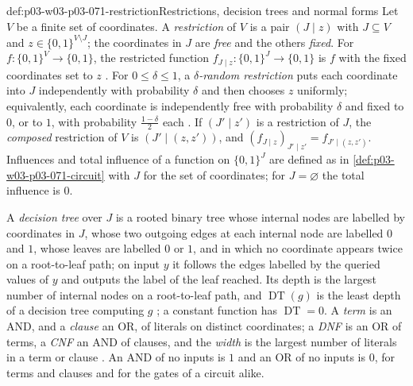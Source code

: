 \begin{hbdefinition}{def:p03-w03-p03-071-restriction}{Restrictions, decision trees and normal forms}
Let \(V\) be a finite set of coordinates.  A \emph{restriction} of \(V\) is a
pair \((J\mid z)\) with \(J\subseteq V\) and \(z\in\{0,1\}^{V\setminus J}\);
the coordinates in \(J\) are \emph{free} and the others \emph{fixed}.  For
\(f:\{0,1\}^V\to\{0,1\}\), the restricted function
\(f_{J\mid z}:\{0,1\}^J\to\{0,1\}\) is \(f\) with the fixed coordinates set
to \(z\) \cite[def.~3.18, p.~75]{ODonnell2021AnalysisBooleanArxiv}.  For
\(0\leq\delta\leq1\), a \emph{\(\delta\)-random restriction} puts each
coordinate into \(J\) independently with probability \(\delta\) and then
chooses \(z\) uniformly; equivalently, each coordinate is independently free
with probability \(\delta\) and fixed to \(0\), or to \(1\), with probability
\(\frac{1-\delta}2\) each
\cite[def.~4.15, p.~98]{ODonnell2021AnalysisBooleanArxiv}.  If \((J'\mid
z')\) is a restriction of \(J\), the \emph{composed} restriction of \(V\) is
\((J'\mid(z,z'))\), and \((f_{J\mid z})_{J'\mid z'}=f_{J'\mid(z,z')}\).
Influences and total influence of a function on \(\{0,1\}^J\) are defined as
in \cref{def:p03-w03-p03-071-circuit} with \(J\) for the set of coordinates;
for \(J=\varnothing\) the total influence is \(0\).

A \emph{decision tree} over \(J\) is a rooted binary tree whose internal
nodes are labelled by coordinates in \(J\), whose two outgoing edges at each
internal node are labelled \(0\) and \(1\), whose leaves are labelled \(0\)
or \(1\), and in which no coordinate appears twice on a root-to-leaf path;
on input \(y\) it follows the edges labelled by the queried values of \(y\)
and outputs the label of the leaf reached.  Its depth is the largest number
of internal nodes on a root-to-leaf path, and \(\operatorname{DT}(g)\) is the
least depth of a decision tree computing \(g\)
\cite[defs.~3.13--3.14, pp.~73--74]{ODonnell2021AnalysisBooleanArxiv}; a
constant function has \(\operatorname{DT}=0\).  A \emph{term} is an AND, and
a \emph{clause} an OR, of literals on distinct coordinates; a \emph{DNF} is
an OR of terms, a \emph{CNF} an AND of clauses, and the \emph{width} is the
largest number of literals in a term or clause
\cite[def.~4.1, p.~93; def.~4.3, p.~94]{ODonnell2021AnalysisBooleanArxiv}.
An AND of no inputs is \(1\) and an OR of no inputs is \(0\), for terms and
clauses and for the gates of a circuit alike.
\end{hbdefinition}


